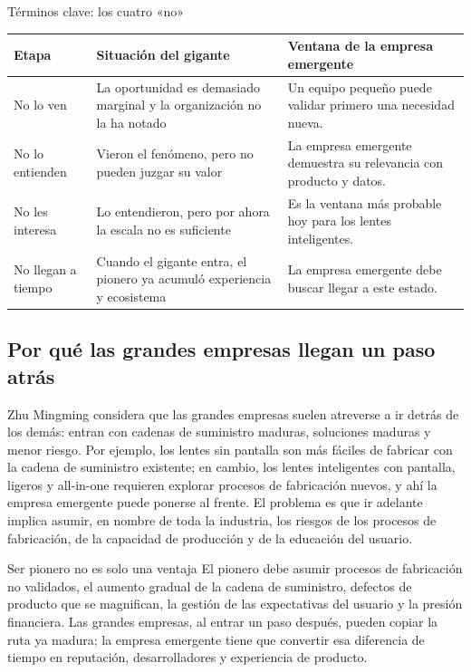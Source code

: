 \documentclass[a4paper]{article}
\begin{document}
\begin{knowledgebox}{Términos clave: los cuatro «no»}
\noindent\begin{tabularx}{\textwidth}{p{}p{}X}
\toprule
Etapa & Situación del gigante & Ventana de la empresa emergente \\
\midrule
No lo ven & La oportunidad es demasiado marginal y la organización no la ha notado & Un equipo pequeño puede validar primero una necesidad nueva. \\
No lo entienden & Vieron el fenómeno, pero no pueden juzgar su valor & La empresa emergente demuestra su relevancia con producto y datos. \\
No les interesa & Lo entendieron, pero por ahora la escala no es suficiente & Es la ventana más probable hoy para los lentes inteligentes. \\
No llegan a tiempo & Cuando el gigante entra, el pionero ya acumuló experiencia y ecosistema & La empresa emergente debe buscar llegar a este estado. \\
\bottomrule
\end{tabularx}
\end{knowledgebox}

\subsection{Por qué las grandes empresas llegan un paso atrás}

Zhu Mingming considera que las grandes empresas suelen atreverse a ir detrás de los demás: entran con cadenas de suministro maduras, soluciones maduras y menor riesgo. Por ejemplo, los lentes sin pantalla son más fáciles de fabricar con la cadena de suministro existente; en cambio, los lentes inteligentes con pantalla, ligeros y all-in-one requieren explorar procesos de fabricación nuevos, y ahí la empresa emergente puede ponerse al frente. El problema es que ir adelante implica asumir, en nombre de toda la industria, los riesgos de los procesos de fabricación, de la capacidad de producción y de la educación del usuario.

\begin{warningbox}{Ser pionero no es solo una ventaja}
El pionero debe asumir procesos de fabricación no validados, el aumento gradual de la cadena de suministro, defectos de producto que se magnifican, la gestión de las expectativas del usuario y la presión financiera. Las grandes empresas, al entrar un paso después, pueden copiar la ruta ya madura; la empresa emergente tiene que convertir esa diferencia de tiempo en reputación, desarrolladores y experiencia de producto.
\end{warningbox}
\end{document}
